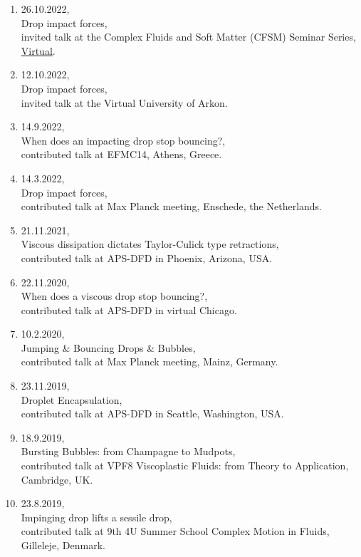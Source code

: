 \documentclass[11pt,a4paper,roman,english,colorlinks,linkcolor=true]{moderncv}
\begin{document}
\begin{enumerate}[leftmargin=2.5cm]
	\item 26.10.2022,\\
	Drop impact forces,\\
	invited talk at the Complex Fluids and Soft Matter (CFSM) Seminar Series, \href{https://youtu.be/enTMAucwUDs}{Virtual}.
	
	\item 12.10.2022,\\
	Drop impact forces,\\
	invited talk at the Virtual University of Arkon.
	
	\item 14.9.2022,\\
	When does an impacting drop stop bouncing?,\\
	contributed talk at EFMC14, Athens, Greece.
	
	\item 14.3.2022,\\
	Drop impact forces,\\
	contributed talk at Max Planck meeting, Enschede, the Netherlands.
	
	\item 21.11.2021,\\
	Viscous dissipation dictates Taylor-Culick type retractions,\\
	contributed talk at APS-DFD in Phoenix, Arizona, USA.
	
	\item 22.11.2020,\\
	When does a viscous drop stop bouncing?,\\
	contributed talk at APS-DFD in virtual Chicago.
	
	\item 10.2.2020,\\
	Jumping \& Bouncing Drops \& Bubbles,\\
	contributed talk at Max Planck meeting, Mainz, Germany.
	
	\item 23.11.2019,\\
	Droplet Encapsulation,\\
	contributed talk at APS-DFD in Seattle, Washington, USA.
	
	\item 18.9.2019,\\
	Bursting Bubbles: from Champagne to Mudpots,\\
	contributed talk at VPF8 Viscoplastic Fluids: from Theory to Application, Cambridge, UK.
		
	\item 23.8.2019,\\
	Impinging drop lifts a sessile drop,\\
	contributed talk at 9th 4U Summer School Complex Motion in Fluids, Gilleleje, Denmark.
	

\end{enumerate}
\end{document}
